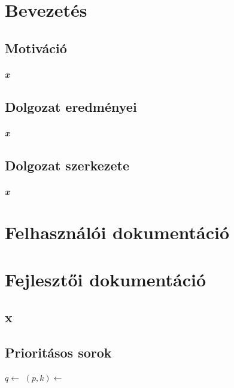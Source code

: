 \documentclass[12pt]{report}
\begin{document}
\tableofcontents

\chapter{Bevezetés}
\section{Motiváció}
\paragraph{x}

\section{Dolgozat eredményei}
\paragraph{x}

\section{Dolgozat szerkezete}
\paragraph{x}

\chapter{Felhasználói dokumentáció}

\chapter{Fejlesztői dokumentáció}

\section{x}

\section{Prioritásos sorok}

\begin{algorithmic}[1]
\State $q \gets$ 
		\State $(p, k) \gets $ 
		\State {}
		\State {}
	\EndWhile
		\State {}
	\EndIf
\EndFor
\end{algorithmic}
\end{document}
